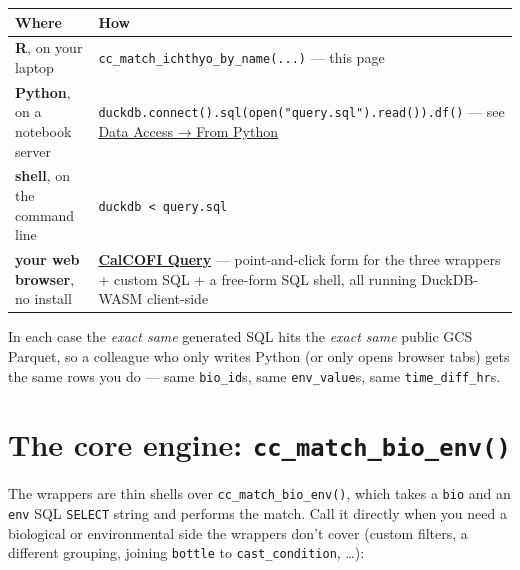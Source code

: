 \documentclass[
  letterpaper,
  DIV=11,
  numbers=noendperiod]{scrreprt}
\begin{document}
\begin{longtable}[]{@{}
  >{\raggedright\arraybackslash}p{}
  >{\raggedright\arraybackslash}p{}@{}}
\toprule\noalign{}
\begin{minipage}[b]{\linewidth}\raggedright
Where
\end{minipage} & \begin{minipage}[b]{\linewidth}\raggedright
How
\end{minipage} \\
\midrule\noalign{}
\endhead
\bottomrule\noalign{}
\endlastfoot
\textbf{R}, on your laptop & \texttt{cc\_match\_ichthyo\_by\_name(...)}
--- this page \\
\textbf{Python}, on a notebook server &
\texttt{duckdb.connect().sql(open("query.sql").read()).df()} --- see
\hyperref[from-python]{Data Access → From Python} \\
\textbf{shell}, on the command line &
\texttt{duckdb\ \textless{}\ query.sql} \\
\textbf{your web browser}, no install &
\textbf{\href{https://calcofi.io/db-query/}{CalCOFI Query}} ---
point-and-click form for the three wrappers + custom SQL + a free-form
SQL shell, all running DuckDB-WASM client-side \\
\end{longtable}

In each case the \emph{exact same} generated SQL hits the \emph{exact
same} public GCS Parquet, so a colleague who only writes Python (or only
opens browser tabs) gets the same rows you do --- same
\texttt{bio\_id}s, same \texttt{env\_value}s, same
\texttt{time\_diff\_hr}s.

\section{\texorpdfstring{The core engine:
\texttt{cc\_match\_bio\_env()}}{The core engine: cc\_match\_bio\_env()}}\label{the-core-engine-cc_match_bio_env}

The wrappers are thin shells over \texttt{cc\_match\_bio\_env()}, which
takes a \texttt{bio} and an \texttt{env} SQL \texttt{SELECT} string and
performs the match. Call it directly when you need a biological or
environmental side the wrappers don't cover (custom filters, a different
grouping, joining \texttt{bottle} to \texttt{cast\_condition}, \ldots):
\end{document}
